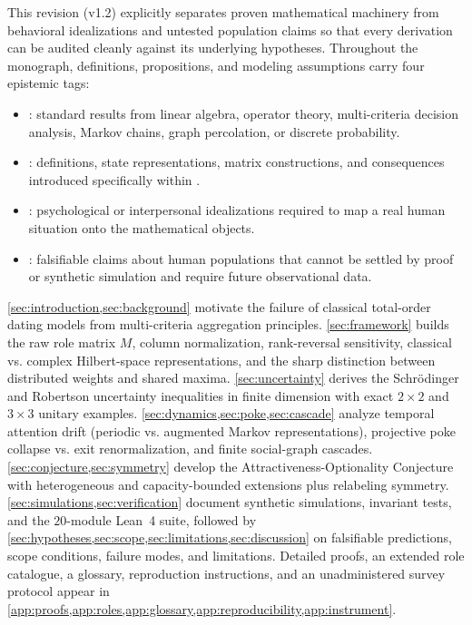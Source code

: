 This revision (v1.2) explicitly separates proven mathematical machinery from
behavioral idealizations and untested population claims so that every derivation can
be audited cleanly against its underlying hypotheses. Throughout the monograph,
definitions, propositions, and modeling assumptions carry four epistemic tags:
\begin{itemize}[nosep]
  \item \layermath: standard results from linear algebra, operator theory, multi-criteria
        decision analysis, Markov chains, graph percolation, or discrete probability.
  \item \layerformal: definitions, state representations, matrix constructions, and
        consequences introduced specifically within \RST{}.
  \item \layerbehav: psychological or interpersonal idealizations required to map a
        real human situation onto the mathematical objects.
  \item \layerempiric: falsifiable claims about human populations that cannot be settled
        by proof or synthetic simulation and require future observational data.
\end{itemize}

\cref{sec:introduction,sec:background} motivate the failure of classical total-order
dating models from multi-criteria aggregation principles. \cref{sec:framework} builds
the raw role matrix $M$, column normalization, rank-reversal sensitivity, classical vs.
complex Hilbert-space representations, and the sharp distinction between distributed
weights and shared maxima. \cref{sec:uncertainty} derives the Schr\"odinger and Robertson
uncertainty inequalities in finite dimension with exact $2\times 2$ and $3\times 3$
unitary examples. \cref{sec:dynamics,sec:poke,sec:cascade} analyze temporal attention
drift (periodic vs. augmented Markov representations), projective poke collapse vs. exit
renormalization, and finite social-graph cascades. \cref{sec:conjecture,sec:symmetry}
develop the Attractiveness-Optionality Conjecture with heterogeneous and capacity-bounded
extensions plus relabeling symmetry. \cref{sec:simulations,sec:verification} document
synthetic simulations, invariant tests, and the $20$-module Lean~4 suite, followed by
\cref{sec:hypotheses,sec:scope,sec:limitations,sec:discussion} on falsifiable predictions,
scope conditions, failure modes, and limitations. Detailed proofs, an extended role
catalogue, a glossary, reproduction instructions, and an unadministered survey protocol
appear in \cref{app:proofs,app:roles,app:glossary,app:reproducibility,app:instrument}.

